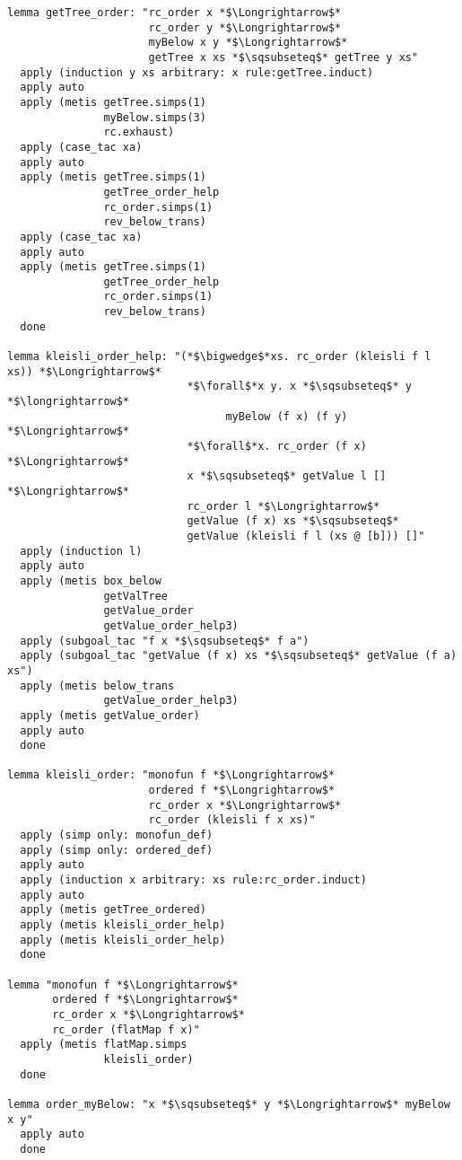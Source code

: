 \begin{lstlisting}[language=Isabelle]
lemma getTree_order: "rc_order x *$\Longrightarrow$* 
                      rc_order y *$\Longrightarrow$* 
                      myBelow x y *$\Longrightarrow$* 
                      getTree x xs *$\sqsubseteq$* getTree y xs"
  apply (induction y xs arbitrary: x rule:getTree.induct)
  apply auto
  apply (metis getTree.simps(1) 
               myBelow.simps(3) 
               rc.exhaust)
  apply (case_tac xa)
  apply auto
  apply (metis getTree.simps(1) 
               getTree_order_help 
               rc_order.simps(1) 
               rev_below_trans)
  apply (case_tac xa)
  apply auto
  apply (metis getTree.simps(1) 
               getTree_order_help 
               rc_order.simps(1) 
               rev_below_trans)
  done

lemma kleisli_order_help: "(*$\bigwedge$*xs. rc_order (kleisli f l xs)) *$\Longrightarrow$*
                            *$\forall$*x y. x *$\sqsubseteq$* y *$\longrightarrow$* 
                                  myBelow (f x) (f y) *$\Longrightarrow$*
                            *$\forall$*x. rc_order (f x) *$\Longrightarrow$*
                            x *$\sqsubseteq$* getValue l [] *$\Longrightarrow$*
                            rc_order l *$\Longrightarrow$*
                            getValue (f x) xs *$\sqsubseteq$* 
                            getValue (kleisli f l (xs @ [b])) []"
  apply (induction l)
  apply auto
  apply (metis box_below 
               getValTree 
               getValue_order 
               getValue_order_help3)
  apply (subgoal_tac "f x *$\sqsubseteq$* f a")
  apply (subgoal_tac "getValue (f x) xs *$\sqsubseteq$* getValue (f a) xs")
  apply (metis below_trans 
               getValue_order_help3)
  apply (metis getValue_order)
  apply auto
  done

lemma kleisli_order: "monofun f *$\Longrightarrow$* 
                      ordered f *$\Longrightarrow$* 
                      rc_order x *$\Longrightarrow$* 
                      rc_order (kleisli f x xs)"
  apply (simp only: monofun_def)
  apply (simp only: ordered_def)
  apply auto
  apply (induction x arbitrary: xs rule:rc_order.induct)
  apply auto
  apply (metis getTree_ordered)
  apply (metis kleisli_order_help)
  apply (metis kleisli_order_help)
  done  

lemma "monofun f *$\Longrightarrow$* 
       ordered f *$\Longrightarrow$* 
       rc_order x *$\Longrightarrow$* 
       rc_order (flatMap f x)"
  apply (metis flatMap.simps 
               kleisli_order)
  done  

lemma order_myBelow: "x *$\sqsubseteq$* y *$\Longrightarrow$* myBelow x y"
  apply auto
  done


\end{lstlisting}
